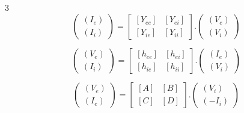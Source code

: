 \documentclass[final]{beamer}
\begin{document}
\begin{frame}[t]
\begin{multicols}{3}
      \begin{equation*}
         \begin{pmatrix}
            (I_e) \\
            (I_i)
         \end{pmatrix}
         =\begin{bmatrix}
            [Y_{ee}] & [Y_{ei}] \\
            [Y_{ie}] & [Y_{ii}]
         \end{bmatrix}.
         \begin{pmatrix}
            (V_e) \\
            (V_i)
         \end{pmatrix}
         \label{def:Y}
      \end{equation*}

      \begin{equation*}
         \begin{pmatrix}
            (V_e) \\
            (I_i)
         \end{pmatrix}
         =\begin{bmatrix}
            [h_{ee}] & [h_{ei}] \\
            [h_{ie}] & [h_{ii}]
         \end{bmatrix}.
         \begin{pmatrix}
            (I_e) \\
            (V_i)
         \end{pmatrix}
         \label{def:h}
      \end{equation*}

      \begin{equation*}
         \begin{pmatrix}
            (V_e) \\
            (I_e)
         \end{pmatrix}
         =\begin{bmatrix}
            [A] & [B] \\
            [C] & [D]
         \end{bmatrix}.
         \begin{pmatrix}
            (V_i) \\
            (-I_i)
         \end{pmatrix}
         \label{def:ABCD}
      \end{equation*}

      \vspace{1cm}



\end{multicols}
\end{frame}
\end{document}
